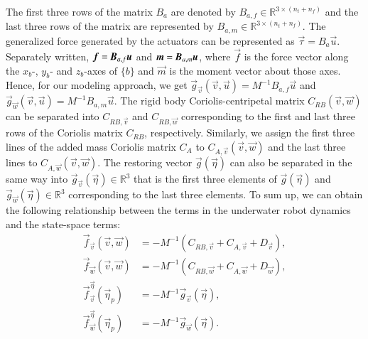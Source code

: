 The first three rows of the matrix $B_{a}$ are denoted by $B_{a,f}\in \mathbb{R}^{3\times(n_{t}+n_{f})}$ and the last three rows of the matrix are represented by $B_{a,m}\in \mathbb{R}^{3\times(n_{t}+n_{f})}$. The generalized force generated by the actuators can be represented as $\vec{\tau}=B_{a}\vec{u}$. Separately written, $\vec{f}=\emph{\textbf{B}}_{a,f}\vec{u}$ and $\vec{m}=\emph{\textbf{B}}_{a,m}\vec{u}$, where $\vec{f}$ is the force vector along the $x_b$-, $y_b$- and $z_b$-axes of $\lbrace b \rbrace$ and $\vec{m}$ is the moment vector about  those axes. Hence, for our modeling approach, we get $\vec{g}_{\vec{v}}(\vec{v},\vec{u})=M^{-1}B_{a,f}\vec{u}$ and
$\vec{g}_{\vec{w}}(\vec{v},\vec{u})=M^{-1}B_{a,m}\vec{u}$. The rigid body Coriolis-centripetal matrix $C_{RB}(\vec{v},\vec{w})$ can be separated into $C_{RB,\vec{v}}$ and $C_{RB,\vec{w}}$ corresponding to the first and last three rows of the Coriolis matrix $C_{RB}$, respectively. Similarly, we assign the first three lines of the added mass Coriolis matrix $C_{A}$ to $C_{A,\vec{v}}(\vec{v},\vec{w})$ and the last three lines to $C_{A,\vec{w}}(\vec{v},\vec{w})$. 
The restoring vector $\vec{g}(\vec{\eta})$ can also be separated in the same way into $\vec{g}_{\vec{v}}(\vec{\eta})\in \mathbb{R}^{3}$ that is the first three elements of $\vec{g}(\vec{\eta})$ and $\vec{g}_{\vec{w}}(\vec{\eta})\in \mathbb{R}^{3}$ corresponding to the last three elements. 
To sum up, we can obtain the following relationship between the terms in the underwater robot dynamics and the state-space terms:
\begin{align}
\vec{f}_{\vec{v}}(\vec{v},\vec{w})&=-M^{-1}(C_{RB,\vec{v}}+C_{A,\vec{v}}+D_{\vec{v}}), \label{EQ:fv}\\
\vec{f}_{\vec{w}}(\vec{v},\vec{w})&=-M^{-1}(C_{RB,\vec{w}}+C_{A,\vec{w}}+D_{\vec{w}}), \label{EQ:fw} \\
\vec{f}_{\vec{v}}^{\vec{\eta}}(\vec{\eta}_{p})&=-M^{-1}\vec{g}_{\vec{v}}(\vec{\eta}), \label{EQ:fveta}\\
\vec{f}_{\vec{w}}^{\vec{\eta}}(\vec{\eta}_{p})&=-M^{-1}\vec{g}_{\vec{w}}(\vec{\eta})\label{EQ:fweta}.
\end{align}
